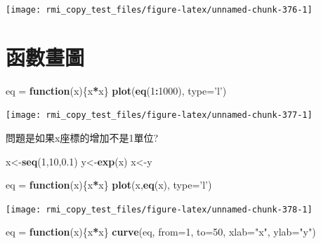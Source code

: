 \documentclass[]{book}
\newenvironment{Shaded}{\begin{snugshade}}{\end{snugshade}}
\newcommand{\KeywordTok}[1]{\textcolor[rgb]{0.13,0.29,0.53}{\textbf{#1}}}
\newcommand{\DataTypeTok}[1]{\textcolor[rgb]{0.13,0.29,0.53}{#1}}
\newcommand{\DecValTok}[1]{\textcolor[rgb]{0.00,0.00,0.81}{#1}}
\newcommand{\FloatTok}[1]{\textcolor[rgb]{0.00,0.00,0.81}{#1}}
\newcommand{\StringTok}[1]{\textcolor[rgb]{0.31,0.60,0.02}{#1}}
\newcommand{\ControlFlowTok}[1]{\textcolor[rgb]{0.13,0.29,0.53}{\textbf{#1}}}
\newcommand{\OperatorTok}[1]{\textcolor[rgb]{0.81,0.36,0.00}{\textbf{#1}}}
\newcommand{\NormalTok}[1]{#1}
\theoremstyle{definition}
\theoremstyle{definition}
\theoremstyle{definition}
\theoremstyle{remark}
\begin{document}
\begin{center}\texttt{[image: rmi\_copy\_test\_files/figure-latex/unnamed-chunk-376-1]} \end{center}

\section{函數畫圖}

\begin{Shaded}
\begin{Highlighting}[]
\NormalTok{eq =}\StringTok{ }\ControlFlowTok{function}\NormalTok{(x)\{x}\OperatorTok{*}\NormalTok{x\}}
\KeywordTok{plot}\NormalTok{(}\KeywordTok{eq}\NormalTok{(}\DecValTok{1}\OperatorTok{:}\DecValTok{1000}\NormalTok{), }\DataTypeTok{type=}\StringTok{'l'}\NormalTok{)}
\end{Highlighting}
\end{Shaded}

\begin{center}\texttt{[image: rmi\_copy\_test\_files/figure-latex/unnamed-chunk-377-1]} \end{center}

問題是如果x座標的增加不是1單位?

\begin{Shaded}
\begin{Highlighting}[]
\NormalTok{x<-}\KeywordTok{seq}\NormalTok{(}\DecValTok{1}\NormalTok{,}\DecValTok{10}\NormalTok{,}\FloatTok{0.1}\NormalTok{)}
\NormalTok{y<-}\KeywordTok{exp}\NormalTok{(x)}
\NormalTok{x<-y}

\NormalTok{eq =}\StringTok{ }\ControlFlowTok{function}\NormalTok{(x)\{x}\OperatorTok{*}\NormalTok{x\}}
\KeywordTok{plot}\NormalTok{(x,}\KeywordTok{eq}\NormalTok{(x), }\DataTypeTok{type=}\StringTok{'l'}\NormalTok{)}
\end{Highlighting}
\end{Shaded}

\begin{center}\texttt{[image: rmi\_copy\_test\_files/figure-latex/unnamed-chunk-378-1]} \end{center}

\begin{Shaded}
\begin{Highlighting}[]
\NormalTok{eq =}\StringTok{ }\ControlFlowTok{function}\NormalTok{(x)\{x}\OperatorTok{*}\NormalTok{x\}}
\KeywordTok{curve}\NormalTok{(eq, }\DataTypeTok{from=}\DecValTok{1}\NormalTok{, }\DataTypeTok{to=}\DecValTok{50}\NormalTok{, }\DataTypeTok{xlab=}\StringTok{"x"}\NormalTok{, }\DataTypeTok{ylab=}\StringTok{"y"}\NormalTok{)}
\end{Highlighting}
\end{Shaded}
\end{document}
